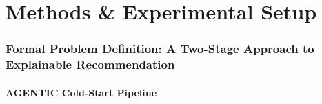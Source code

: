 \doublespacing %

\chapter{Methods \& Experimental Setup}
\label{ch2}

\begin{spacing}{1} %
\minitoc %
\end{spacing} %
\thesisspacing %

\subsection{Formal Problem Definition: A Two-Stage Approach to Explainable Recommendation}

\subsubsection{AGENTIC Cold-Start Pipeline}



